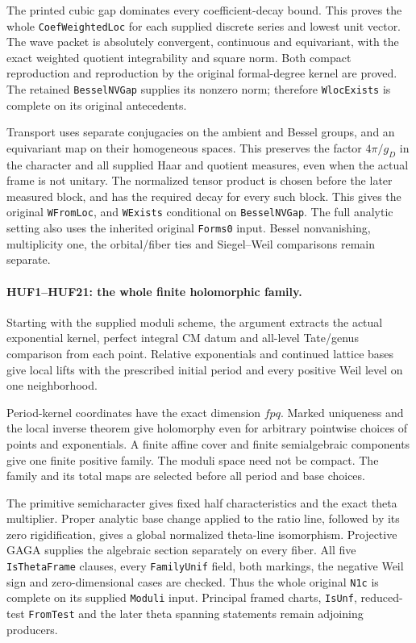 The printed cubic gap dominates every coefficient-decay bound.
This proves the whole \texttt{Coef\allowbreak Weighted\allowbreak Loc} for each supplied
discrete series and lowest unit vector. The wave packet is absolutely
convergent, continuous and equivariant, with the exact weighted
quotient integrability and square norm. Both compact reproduction
and reproduction by the original formal-degree kernel are proved.
The retained \texttt{Bessel\allowbreak NVGap} supplies its nonzero norm;
therefore \texttt{Wloc\allowbreak Exists} is complete on its original antecedents.

Transport uses separate conjugacies on the ambient and Bessel groups,
and an equivariant map on their homogeneous spaces. This preserves
the factor \(4\pi/g_D\) in the character and all supplied Haar
and quotient measures, even when the actual frame is not unitary.
The normalized tensor product is chosen before the later measured
block, and has the required decay for every such block. This gives
the original \texttt{WFrom\allowbreak Loc}, and \texttt{WExists} conditional
on \texttt{Bessel\allowbreak NVGap}. The full analytic setting also uses the
inherited original \texttt{Forms0} input. Bessel nonvanishing,
multiplicity one, the orbital/fiber ties and Siegel--Weil comparisons
remain separate.

\paragraph{HUF1--HUF21: the whole finite holomorphic family.}
Starting with the supplied moduli scheme, the argument extracts the
actual exponential kernel, perfect integral CM datum and all-level
Tate/genus comparison from each point. Relative exponentials and
continued lattice bases give local lifts with the prescribed initial
period and every positive Weil level on one neighborhood.

Period-kernel coordinates have the exact dimension \(fpq\).
Marked uniqueness and the local inverse theorem give holomorphy even
for arbitrary pointwise choices of points and exponentials. A finite
affine cover and finite semialgebraic components give one finite
positive family. The moduli space need not be compact. The family
and its total maps are selected before all period and base choices.

The primitive semicharacter gives fixed half characteristics and the
exact theta multiplier. Proper analytic base change applied to the
ratio line, followed by its zero rigidification, gives a global
normalized theta-line isomorphism. Projective GAGA supplies the
algebraic section separately on every fiber. All five
\texttt{Is\allowbreak Theta\allowbreak Frame} clauses, every \texttt{Family\allowbreak Unif} field,
both markings, the negative Weil sign and zero-dimensional cases
are checked. Thus the whole original \texttt{N1c} is complete
on its supplied \texttt{Moduli} input. Principal framed charts,
\texttt{Is\allowbreak Unf}, reduced-test \texttt{From\allowbreak Test} and the later theta
spanning statements remain adjoining producers.


